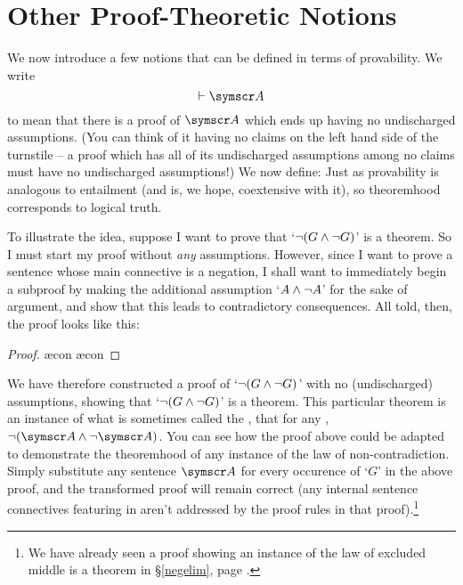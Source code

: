 \section{Other Proof-Theoretic Notions}

We now introduce a few notions that can be defined in terms of provability. We write
$$\proves \meta{A}$$
to mean that there is a proof of $\meta{A}$ which ends up having no undischarged assumptions. (You can think of it having no claims on the left hand side of the turnstile – a proof which has all of its undischarged assumptions among no claims must have no undischarged assumptions!) We now define:
Just as provability is analogous to entailment (and is, we hope, coextensive with it), so theoremhood corresponds to logical truth. 

To illustrate the idea, suppose I want to prove that `$\neg (G \wedge \neg G)$' is a theorem. So I must start my proof without \emph{any} assumptions. However, since I want to prove a sentence whose main connective is a negation, I shall want to  immediately begin a subproof by making the additional assumption `$A \wedge \neg A$' for the sake of argument, and show that this leads to contradictory consequences. All told, then, the proof looks like this:
	\begin{proof}
		\open
			\ae{con}
			\ae{con}
		\close
	\end{proof}
We have therefore constructed a proof of `$\neg (G \wedge \neg G)$' with no (undischarged) assumptions, showing that `$\neg (G \wedge \neg G)$' is a theorem. This particular theorem is an instance of what is sometimes called the , that for any , $\enot(\meta{A}\eand\enot\meta{A})$. You can see how the proof above could be adapted to demonstrate the theoremhood of any instance of the law of non-contradiction. Simply substitute any sentence $\meta{A}$ for every occurence of `$G$' in the above proof, and the transformed proof will remain correct (any internal sentence connectives featuring in  aren't addressed by the proof rules in that proof).\footnote{We have already seen a proof showing an instance of the law of excluded middle is a theorem in §\ref{negelim}, page \pageref{excmidd}.}

